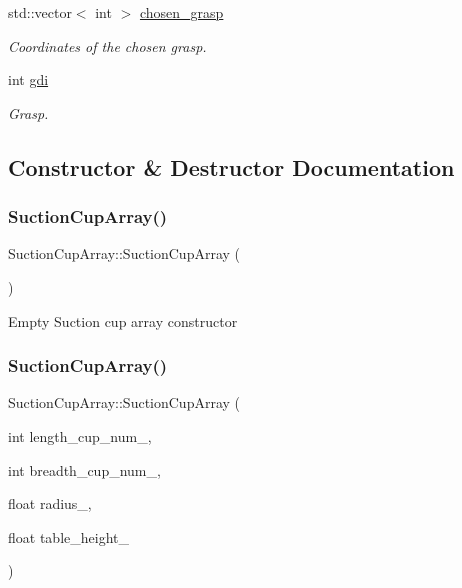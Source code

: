 \begin{DoxyCompactItemize}
std\+::vector$<$ int $>$ \hyperlink{classSuctionCupArray_ada1374d63871766ab0bd82306443b87c}{chosen\+\_\+grasp}
\begin{DoxyCompactList}\small\item\em Coordinates of the chosen grasp. \end{DoxyCompactList}\item 
\mbox{\label{classSuctionCupArray_a6d938bb2d8424798495f1a74ec59300d}} 
int \hyperlink{classSuctionCupArray_a6d938bb2d8424798495f1a74ec59300d}{gdi}
\begin{DoxyCompactList}\small\item\em Grasp. \end{DoxyCompactList}\end{DoxyCompactItemize}


\subsection{Constructor \& Destructor Documentation}
\mbox{\label{classSuctionCupArray_a33bbdfb41d4a5b5de459187ee800d317}} 
\subsubsection{\texorpdfstring{Suction\+Cup\+Array()}{SuctionCupArray()}\hspace{0.1cm}{\footnotesize\ttfamily [1/2]}}
{\footnotesize\ttfamily Suction\+Cup\+Array\+::\+Suction\+Cup\+Array (\begin{DoxyParamCaption}{ }\end{DoxyParamCaption})\hspace{0.3cm}{\ttfamily [inline]}}

Empty Suction cup array constructor \mbox{\label{classSuctionCupArray_adc7c28d5922124c15c8b31b4ac391879}} 
\subsubsection{\texorpdfstring{Suction\+Cup\+Array()}{SuctionCupArray()}\hspace{0.1cm}{\footnotesize\ttfamily [2/2]}}
{\footnotesize\ttfamily Suction\+Cup\+Array\+::\+Suction\+Cup\+Array (\begin{DoxyParamCaption}\item[{int}]{length\+\_\+cup\+\_\+num\+\_\+,  }\item[{int}]{breadth\+\_\+cup\+\_\+num\+\_\+,  }\item[{float}]{radius\+\_\+,  }\item[{float}]{table\+\_\+height\+\_\+ }\end{DoxyParamCaption})\hspace{0.3cm}{\ttfamily [inline]}}

